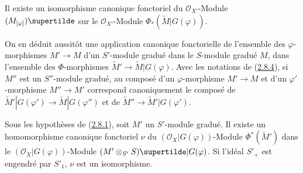 \begin{proposition}[2.8.7]
\label{II.2.8.7-fr}
Il existe un isomorphisme canonique fonctoriel du $\mathcal{O}_{X'}$-Module
$(M_{[\varphi]})\supertilde$ sur le
$\mathcal{O}_{X'}$-Module $\Phi_*(\widetilde{M}|G(\varphi))$.
\end{proposition}

On en déduit aussitôt une application canonique fonctorielle de l'ensemble
des $\varphi$-morphismes $M'\to M$ d'un $S'$-module gradué dans le $S$-module
gradué $M$, dans l'ensemble des $\Phi$-morphismes
$\widetilde{M}'\to\widetilde{M}|G(\varphi)$. Avec les notations de
(\hyperref[II.2.8.4-fr]{2.8.4}), si $M''$ est un $S''$-module gradué, au
composé d'un $\varphi$-morphisme $M'\to M$ et d'un $\varphi'$-morphisme
$M''\to M'$ correspond canoniquement le composé de
$\widetilde{M}'|G(\varphi')\to\widetilde{M}|G(\varphi'')$ et de
$\widetilde{M}''\to\widetilde{M}'|G(\varphi')$.

\begin{proposition}[2.8.8]
\label{II.2.8.8-fr}
Sous les hypothèses de \textup{(\hyperref[II.2.8.1-fr]{2.8.1})}, soit $M'$ un
$S'$-module gradué. Il existe un homomorphisme canonique fonctoriel $\nu$ du
$(\mathcal{O}_X|G(\varphi))$-Module $\Phi^*(\widetilde{M}')$ dans le
$(\mathcal{O}_X|G(\varphi))$-Module
$(M'\otimes_{S'}S)\supertilde|G(\varphi)$. Si l'idéal $S'_+$
est engendré par $S'_1$, $\nu$ est un isomorphisme.
\end{proposition}

